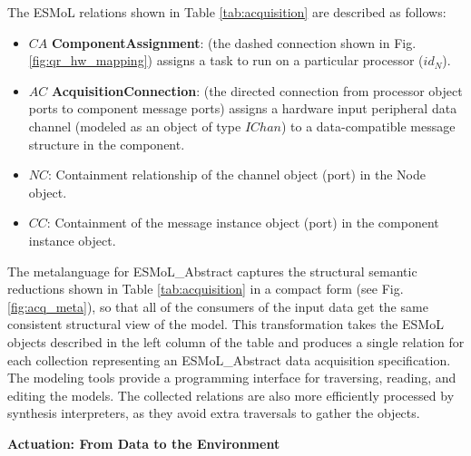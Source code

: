 The ESMoL relations shown in Table \ref{tab:acquisition} are 
described as follows:

\begin{itemize}
 \item $CA$ {\bf ComponentAssignment}: (the dashed connection shown in 
Fig. \ref{fig:qr_hw_mapping}) assigns a task to run on a particular 
processor ($id_N$).
 \item $AC$ {\bf AcquisitionConnection}: (the directed connection from 
processor object ports to component message ports) assigns a hardware input peripheral
data channel (modeled as an object of type $IChan$) to a data-compatible 
message structure in the component.
 \item $NC$: Containment relationship of the channel object (port) in the Node object.
 \item $CC$: Containment of the message instance object (port) in the component instance object.
\end{itemize}

The metalanguage for ESMoL\_Abstract captures the structural
semantic reductions shown in Table \ref{tab:acquisition} in a compact form (see Fig. \ref{fig:acq_meta}), so that all of the consumers of the input data get the same consistent structural view of the model. This transformation takes the ESMoL objects described in the left column of the table and produces a single relation for each
collection representing an ESMoL\_Abstract data acquisition specification. The modeling tools provide a programming interface for traversing, reading, and editing the models.
The collected relations are also more efficiently processed by 
synthesis interpreters, as they avoid extra traversals to gather the 
objects.  

\textbf{Actuation: From Data to the Environment}

